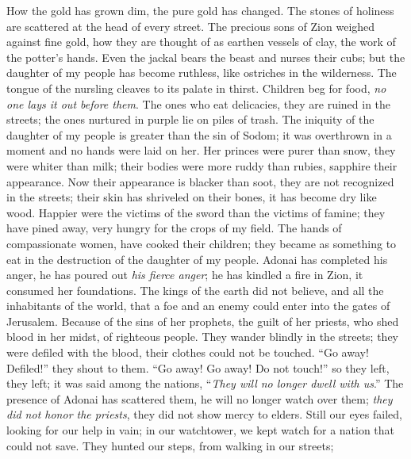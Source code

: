 \begin{biblechapter} %
 How the gold has grown dim, 
the pure gold has changed. 
The stones of holiness are scattered 
at the head of every street.
\verse The precious sons of Zion 
weighed against fine gold, 
how they are thought of as earthen vessels of clay, 
the work of the potter’s hands.
\verse Even the jackal bears the beast 
and nurses their cubs; 
but the daughter of my people has become ruthless, 
like ostriches in the wilderness.
\verse The tongue of the nursling cleaves 
to its palate in thirst. 
Children beg for food, 
\textit{no one lays it out before them}.
\verse The ones who eat delicacies, 
they are ruined in the streets; 
the ones nurtured in purple 
lie on piles of trash.
\verse The iniquity of the daughter of my people is greater 
than the sin of Sodom; 
it was overthrown in a moment 
and no hands were laid on her.
\verse Her princes were purer than snow, 
they were whiter than milk; 
their bodies were more ruddy than rubies, 
sapphire their appearance.
\verse Now their appearance is blacker than soot, 
they are not recognized in the streets; 
their skin has shriveled on their bones, 
it has become dry like wood.
\verse Happier were the victims of the sword 
than the victims of famine; 
they have pined away, very hungry 
for the crops of my field.
\verse The hands of compassionate women, 
have cooked their children; 
they became as something to eat 
in the destruction of the daughter of my people.
\verse Adonai has completed his anger, 
he has poured out \textit{his fierce anger}; 
he has kindled a fire in Zion, 
it consumed her foundations.
\verse The kings of the earth did not believe, 
and all the inhabitants of the world, 
that a foe and an enemy could enter 
into the gates of Jerusalem.
\verse Because of the sins of her prophets, 
the guilt of her priests, 
who shed blood in her midst, 
of righteous people.
\verse They wander blindly in the streets; 
they were defiled with the blood, 
their clothes 
could not be touched.
\verse “Go away! Defiled!” they shout to them. 
“Go away! Go away! Do not touch!” 
so they left, they left; it was said among the nations, 
“\textit{They will no longer dwell with us}.”
\verse The presence of Adonai has scattered them, 
he will no longer watch over them; 
\textit{they did not honor the priests}, 
they did not show mercy to elders.
\verse Still our eyes failed, 
looking for our help in vain; 
in our watchtower, we kept watch 
for a nation that could not save.
\verse They hunted our steps, 
from walking in our streets; 

\end{biblechapter}
